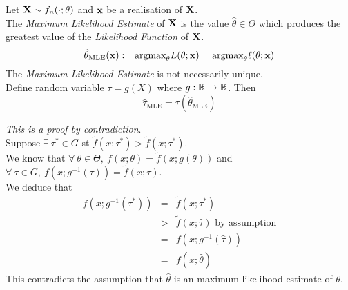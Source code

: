 \documentclass[11pt,a4paper]{article}
\begin{document}
Let $\textbf{X}\sim f_n(\cdot;\theta)$ and $\textbf{x}$ be a realisation of $\textbf{X}$.\\
The \textit{Maximum Likelihood Estimate} of $\textbf{X}$ is the value $\hat\theta\in\Theta$ which produces the greatest value of the \textit{Likelihood Function} of $\textbf{X}$.
$$\hat\theta_\text{MLE}(\textbf{x}):=\text{argmax}_\theta L(\theta;\textbf{x})=\text{argmax}_\theta\ell(\theta;\textbf{x})$$
\nb The \textit{Maximum Likelihood Estimate} is not necessarily unique.\\

Define random variable $\tau=g(X)$ where $g:\mathbb{R}\to\mathbb{R}$. Then
$$\hat\tau_\text{MLE}=\tau(\hat\theta_\text{MLE})$$

\textit{This is a proof by contradiction}.\\
Suppose $\exists\ \tau^*\in G$ st $\tilde{f}(x;\tau^*)>\tilde{f}(x;\tau^*)$.\\
We know that $\forall\ \theta\in\Theta,\ f(x;\theta)=\tilde{f}(x;g(\theta))$ and $\forall\ \tau\in G,\ f(x;g^{-1}(\tau))=\tilde{f}(x;\tau)$.\\
We deduce that
\[\begin{array}{rcl}
f(x;g^{-1}(\tau^*))&=&\tilde{f}(x;\tau^*)\\
&>&\tilde{f}(x;\hat{\tau})\text{ by assumption}\\
&=&f(x;g^{-1}(\hat{\tau}))\\
&=&f(x;\hat{\theta})
\end{array}\]
This contradicts the assumption that $\hat{\theta}$ is an maximum likelihood estimate of $\theta$.\proved
\end{document}
